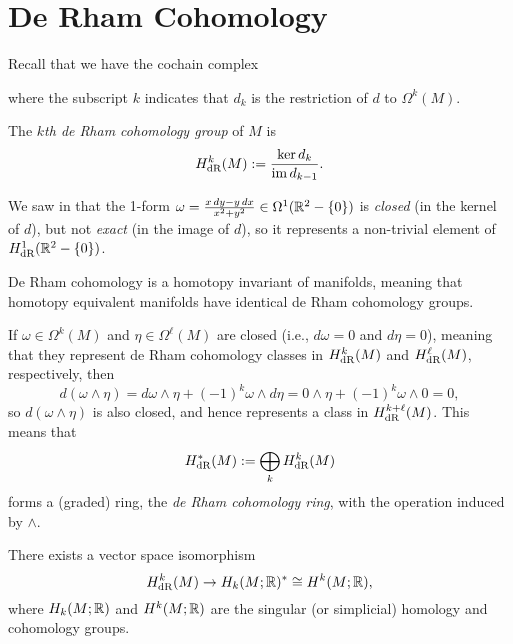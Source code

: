 
\section{De Rham Cohomology}
\label{sec:de Rham}

Recall that we have the cochain complex
	\begin{center}
	\end{center}
where the subscript $k$ indicates that $d_k$ is the restriction of $d$ to $\Omega^k(M)$.

\begin{definition}\label{def:de Rham cohomology}
	The \emph{$k$th de Rham cohomology group} of $M$ is
	\[
		H_{\text{dR}}^k(M) := \frac{\ker d_k}{\operatorname{im} d_{k-1}}.
	\]
\end{definition}

\begin{example}\label{ex:closed not exact 2}
	We saw in  that the 1-form $\omega = \frac{x\, dy - y\, dx}{x^2 + y^2} \in \Omega^1(\mathbb{R}^2 -\{0\})$ is \emph{closed} (in the kernel of $d$), but not \emph{exact} (in the image of $d$), so it represents a non-trivial element of $H_{\text{dR}}^1(\mathbb{R}^2 - \{0\})$.
\end{example}

De Rham cohomology is a homotopy invariant of manifolds, meaning that homotopy equivalent manifolds have identical de Rham cohomology groups. 

If $\omega \in \Omega^k(M)$ and $\eta \in \Omega^\ell(M)$ are closed (i.e., $d \omega = 0$ and $d\eta = 0$), meaning that they represent de Rham cohomology classes in $H_{\text{dR}}^k(M)$ and  $H_{\text{dR}}^\ell(M)$, respectively, then
\[
	d(\omega \wedge \eta) = d\omega \wedge \eta + (-1)^k \omega \wedge d\eta = 0 \wedge \eta + (-1)^k \omega \wedge 0 = 0,
\]
so $d(\omega \wedge \eta)$ is also closed, and hence represents a class in $H_{\text{dR}}^{k+\ell}(M)$. This means that
\[
	H_{\text{dR}}^\ast(M) := \bigoplus_k H_{\text{dR}}^k(M)
\]
forms a (graded) ring, the \emph{de Rham cohomology ring}, with the operation induced by $\wedge$.

\begin{theorem}\label{thm:de Rham}
	There exists a vector space isomorphism
	\[
		H_{\text{dR}}^k(M) \to H_k(M;\mathbb{R})^\ast \cong H^k(M;\mathbb{R}),
	\]
	where $H_k(M;\mathbb{R})$ and $H^k(M;\mathbb{R})$ are the singular (or simplicial) homology and cohomology groups.
\end{theorem}

